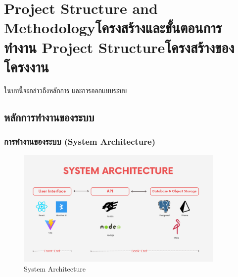 \chapter{\ifproject%
      \ifenglish Project Structure and Methodology\else โครงสร้างและขั้นตอนการทำงาน\fi
  \else%
      \ifenglish Project Structure\else โครงสร้างของโครงงาน\fi
  \fi
 }

ในบทนี้จะกล่าวถึงหลักการ และการออกแบบระบบ

\makeatletter


\makeatother

\section{หลักการทำงานของระบบ}


\subsection{การทำงานของระบบ (System Architecture)}
\begin{figure}[h]
    \begin{center}
        \includegraphics[width=0.9\textwidth]{img/system achitecture.png}
    \end{center}
    \caption[Poem]{System Architecture}
    \label{fig:system_overview}
\end{figure}


